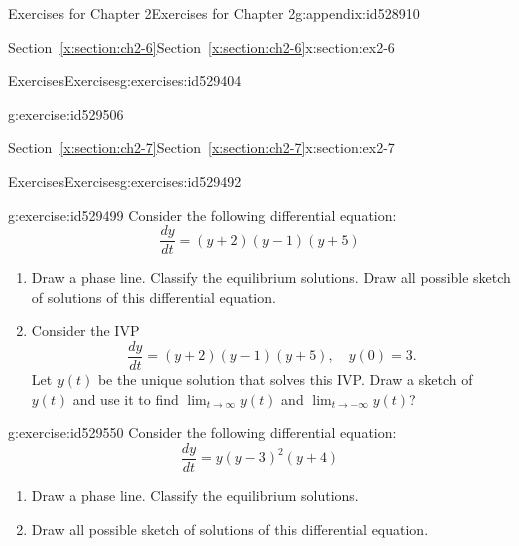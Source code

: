 \documentclass[oneside,10pt,]{book}
\newcommand{\xreffont}{\relax}
\numberwithin{equation}{section}
\numberwithin{equation}{section}
\begin{document}
\begin{appendixptx}{Exercises for Chapter 2}{}{Exercises for Chapter 2}{}{}{g:appendix:id528910}
\begin{sectionptx}{Section~{\xreffont\ref*{x:section:ch2-6}}}{}{Section~{\xreffont\ref*{x:section:ch2-6}}}{}{}{x:section:ex2-6}
\begin{exercises-subsection-numberless}{Exercises}{}{Exercises}{}{}{g:exercises:id529404}
\begin{divisionexercise}{5}{}{}{g:exercise:id529506}
\begin{enumerate}[label=(\alph*)]
\end{enumerate}
\end{divisionexercise}%
\end{exercises-subsection-numberless}
\end{sectionptx}
%
%
\typeout{************************************************}
\typeout{Section C.7 Section~{\xreffont\ref*{x:section:ch2-7}}}
\typeout{************************************************}
%
\begin{sectionptx}{Section~{\xreffont\ref*{x:section:ch2-7}}}{}{Section~{\xreffont\ref*{x:section:ch2-7}}}{}{}{x:section:ex2-7}
%
%
\typeout{************************************************}
\typeout{************************************************}
%
\begin{exercises-subsection-numberless}{Exercises}{}{Exercises}{}{}{g:exercises:id529492}
\begin{divisionexercise}{1}{}{}{g:exercise:id529499}%
Consider the following differential equation:%
\begin{equation*}
\frac{dy}{dt}=\left(y+2\right)\left(y-1\right)\left(y+5\right)
\end{equation*}
%
%
\begin{enumerate}[label=(\alph*)]
\item{}Draw a phase line. Classify the equilibrium solutions. Draw all possible sketch of solutions of this differential equation.%
\item{}Consider the IVP%
\begin{equation*}
\frac{dy}{dt}=\left(y+2\right)\left(y-1\right)\left(y+5\right),\,\,\,\,\,\,y(0)=3.
\end{equation*}
Let \(y(t)\) be the unique solution that solves this IVP. Draw a sketch of \(y(t)\) and use it to find \(\lim_{t\to\infty}y(t)\) and \(\lim_{t\to-\infty}y(t)\)?%
\end{enumerate}
\end{divisionexercise}%
\begin{divisionexercise}{2}{}{}{g:exercise:id529550}%
Consider the following differential equation:%
\begin{equation*}
\frac{dy}{dt}=y\left(y-3\right)^{2}\left(y+4\right)
\end{equation*}
%
%
\begin{enumerate}[label=(\alph*)]
\item{}Draw a phase line. Classify the equilibrium solutions.%
\item{}Draw all possible sketch of solutions of this differential equation.%

\end{enumerate}
\end{divisionexercise}
\end{exercises-subsection-numberless}
\end{sectionptx}
\end{appendixptx}
\end{document}
